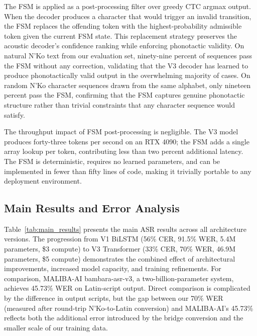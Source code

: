 \documentclass[11pt]{article}
\newcommand{\nko}{N'Ko}
\begin{document}
The FSM is applied as a post-processing filter over greedy CTC argmax output. When the decoder produces a character that would trigger an invalid transition, the FSM replaces the offending token with the highest-probability admissible token given the current FSM state. This replacement strategy preserves the acoustic decoder's confidence ranking while enforcing phonotactic validity. On natural \nko{} text from our evaluation set, ninety-nine percent of sequences pass the FSM without any correction, validating that the V3 decoder has learned to produce phonotactically valid output in the overwhelming majority of cases. On random \nko{} character sequences drawn from the same alphabet, only nineteen percent pass the FSM, confirming that the FSM captures genuine phonotactic structure rather than trivial constraints that any character sequence would satisfy.

The throughput impact of FSM post-processing is negligible. The V3 model produces forty-three tokens per second on an RTX 4090; the FSM adds a single array lookup per token, contributing less than two percent additional latency. The FSM is deterministic, requires no learned parameters, and can be implemented in fewer than fifty lines of code, making it trivially portable to any deployment environment.

\subsection{Main Results and Error Analysis}
\label{sec:asr_results}

Table~\ref{tab:main_results} presents the main ASR results across all architecture versions. The progression from V1 BiLSTM (56\% CER, 91.5\% WER, 5.4M parameters, \$3 compute) to V3 Transformer (33\% CER, 70\% WER, 46.9M parameters, \$5 compute) demonstrates the combined effect of architectural improvements, increased model capacity, and training refinements. For comparison, MALIBA-AI bambara-asr-v3, a two-billion-parameter system, achieves 45.73\% WER on Latin-script output. Direct comparison is complicated by the difference in output scripts, but the gap between our 70\% WER (measured after round-trip \nko{}-to-Latin conversion) and MALIBA-AI's 45.73\% reflects both the additional error introduced by the bridge conversion and the smaller scale of our training data.
\end{document}
